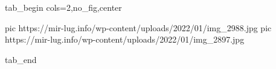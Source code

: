  
 
 
 
 


\ifcmt
  tab_begin cols=2,no_fig,center

     pic https://mir-lug.info/wp-content/uploads/2022/01/img_2988.jpg
		 pic https://mir-lug.info/wp-content/uploads/2022/01/img_2897.jpg

  tab_end
\fi
